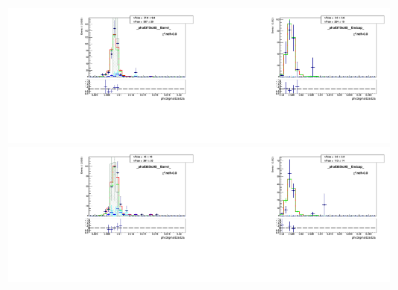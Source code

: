 \begin{figure}[htb]
  \begin{center}
   \includegraphics[width=0.45\textwidth]{../figs/figs_v11/ELECTRON_WGamma/MCclosureWjetsPlusWg/c_TEMPL_SIHIH_UNblind__phoEt75to85__Barrel__RooFit_MCclosure.pdf}\includegraphics[width=0.45\textwidth]{../figs/figs_v11/ELECTRON_WGamma/MCclosureWjetsPlusWg/c_TEMPL_SIHIH_UNblind__phoEt75to85__Endcap__RooFit_MCclosure.pdf}\\
   \includegraphics[width=0.45\textwidth]{../figs/figs_v11/ELECTRON_WGamma/MCclosureWjetsPlusWg/c_TEMPL_SIHIH_UNblind__phoEt85to95__Barrel__RooFit_MCclosure.pdf}\includegraphics[width=0.45\textwidth]{../figs/figs_v11/ELECTRON_WGamma/MCclosureWjetsPlusWg/c_TEMPL_SIHIH_UNblind__phoEt85to95__Endcap__RooFit_MCclosure.pdf}\\

\end{center}
\end{figure}
